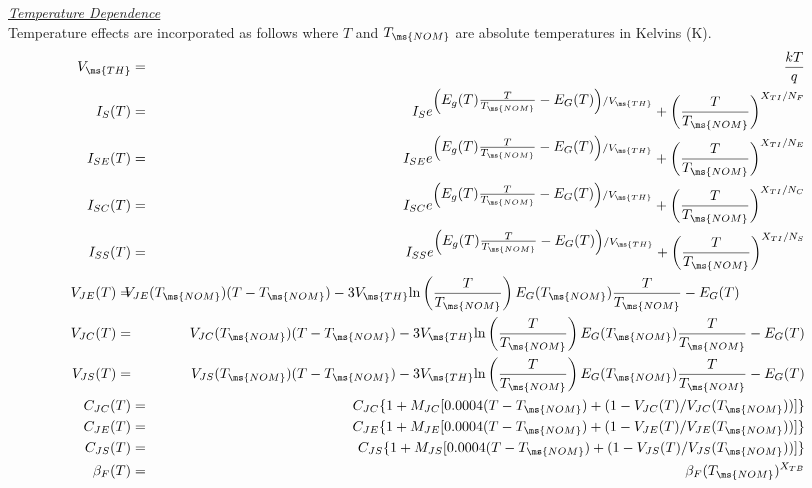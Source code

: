 \noindent\underline{\sl \large Temperature Dependence}  
\\[0.1in]
Temperature effects are incorporated as follows where $T$ and
$T_{\ms{NOM}}$ are absolute temperatures in Kelvins (K).
\begin{eqnarray}
V_{\ms{TH}} & = & {{kT} \over q}\\
I_S (T) & = & I_S e^{\left( \textstyle E_g(T) {T \over
{T_{\ms{NOM}}}}
      - E_G(T) \right) /V_{\ms{TH}}}+
      \left( {T \over {T_{\ms{NOM}}}} \right) ^{X_{TI}/N_F}\\
I_{SE}(T)&=&I_{SE} e^{\left( \textstyle E_g(T) {T \over
{T_{\ms{NOM}}}}
      - E_G(T) \right) /V_{\ms{TH}}}+
      \left( {T \over {T_{\ms{NOM}}}} \right) ^{X_{TI}/N_E}\\
I_{SC}(T)&=&I_{SC} e^{\left( \textstyle E_g(T) {T \over
{T_{\ms{NOM}}}}
      - E_G(T) \right) /V_{\ms{TH}}}+
      \left( {T \over {T_{\ms{NOM}}}} \right) ^{X_{TI}/N_C}\\
I_{SS}(T)&=&I_{SS} e^{\left( \textstyle E_g(T) {T \over
{T_{\ms{NOM}}}}
      - E_G(T) \right) /V_{\ms{TH}}}+
      \left( {T \over {T_{\ms{NOM}}}} \right) ^{X_{TI}/N_S}\\
V_{JE}(T) =&&\hspace{-0.35in} V_{JE}(T_{\ms{NOM}})(T-T_{\ms{NOM}})
        -3V_{\ms{TH}}\mbox{ln}\left( {T \over {T_{\ms{NOM}}}} \right)
      E_G(T_{\ms{NOM}}){T \over {T_{\ms{NOM}}}} -E_G(T)
      \ \ \ \ \ \ \ \ \ \ \ \ \ \  \\
V_{JC}(T)=&&\hspace{-0.35in}V_{JC}(T_{\ms{NOM}})(T-T_{\ms{NOM}})
        -3V_{\ms{TH}}\mbox{ln}\left( {T \over {T_{\ms{NOM}}}} \right)
      E_G(T_{\ms{NOM}}){T \over {T_{\ms{NOM}}}} -E_G(T) \\
V_{JS}(T)=&&\hspace{-0.35in}V_{JS}(T_{\ms{NOM}})(T-T_{\ms{NOM}})
        -3V_{\ms{TH}}\mbox{ln}\left( {T \over {T_{\ms{NOM}}}} \right)
      E_G(T_{\ms{NOM}}){T \over {T_{\ms{NOM}}}} -E_G(T) \\
C_{JC} (T) & = & C_{JC} \{1 +
     M_{JC} [0.0004(T-T_{\ms{NOM}})+(1-V_{JC}(T)/V_{JC}(T_{\ms{NOM}}))]\}\\
C_{JE} (T) & = & C_{JE} \{1 +
     M_{JE} [0.0004(T-T_{\ms{NOM}})+(1-V_{JE}(T)/V_{JE}(T_{\ms{NOM}}))]\}\\
C_{JS} (T) & = & C_{JS} \{1 +
     M_{JS} [0.0004(T-T_{\ms{NOM}})+(1-V_{JS}(T)/V_{JS}(T_{\ms{NOM}}))]\}\\
\beta_F(T)&=&\beta_F(T_{\ms{NOM}})^{X_{TB}}\\

\end{eqnarray}
